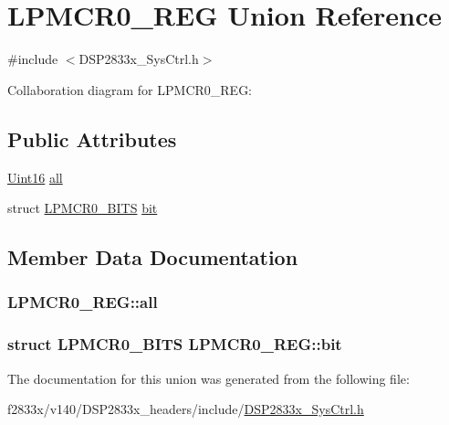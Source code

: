 \hypertarget{union_l_p_m_c_r0___r_e_g}{}\section{L\+P\+M\+C\+R0\+\_\+\+R\+E\+G Union Reference}
\label{union_l_p_m_c_r0___r_e_g}


{\ttfamily \#include $<$D\+S\+P2833x\+\_\+\+Sys\+Ctrl.\+h$>$}



Collaboration diagram for L\+P\+M\+C\+R0\+\_\+\+R\+E\+G\+:
\subsection*{Public Attributes}
\begin{DoxyCompactItemize}
\item 
\hyperlink{_d_s_p2833x___device_8h_a59a9f6be4562c327cbfb4f7e8e18f08b}{Uint16} \hyperlink{union_l_p_m_c_r0___r_e_g_a93d128db10fffb86e6fa0d53b7c35647}{all}
\item 
struct \hyperlink{struct_l_p_m_c_r0___b_i_t_s}{L\+P\+M\+C\+R0\+\_\+\+B\+I\+T\+S} \hyperlink{union_l_p_m_c_r0___r_e_g_abc05ed63aaf36024e3e19b99b84104f2}{bit}
\end{DoxyCompactItemize}


\subsection{Member Data Documentation}
\hypertarget{union_l_p_m_c_r0___r_e_g_a93d128db10fffb86e6fa0d53b7c35647}{}
\subsubsection[{all}]{ L\+P\+M\+C\+R0\+\_\+\+R\+E\+G\+::all}\label{union_l_p_m_c_r0___r_e_g_a93d128db10fffb86e6fa0d53b7c35647}
\hypertarget{union_l_p_m_c_r0___r_e_g_abc05ed63aaf36024e3e19b99b84104f2}{}
\subsubsection[{bit}]{\setlength{\rightskip}{0pt plus 5cm}struct {\bf L\+P\+M\+C\+R0\+\_\+\+B\+I\+T\+S} L\+P\+M\+C\+R0\+\_\+\+R\+E\+G\+::bit}\label{union_l_p_m_c_r0___r_e_g_abc05ed63aaf36024e3e19b99b84104f2}


The documentation for this union was generated from the following file\+:\begin{DoxyCompactItemize}
\item 
f2833x/v140/\+D\+S\+P2833x\+\_\+headers/include/\hyperlink{_d_s_p2833x___sys_ctrl_8h}{D\+S\+P2833x\+\_\+\+Sys\+Ctrl.\+h}\end{DoxyCompactItemize}
